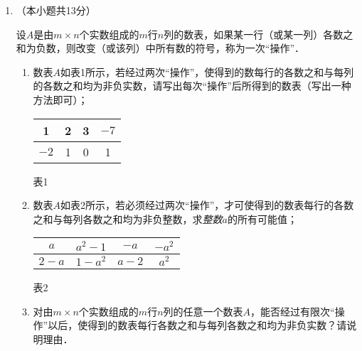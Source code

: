 \documentclass[a4paper]{ctexart}%
\begin{document}
\begin{itemize}
\begin{enumerate}[leftmargin=*]
\bigskip\bigskip\bigskip\bigskip

\item （本小题共13分）

设$A$是由$m\times n$个实数组成的$m$行$n$列的数表，如果某一行（或某一列）各数之和为负数，则改变（或该列）中所有数的符号，称为一次“操作”．
\begin{enumerate}[align=left,leftmargin=*,labelsep=0pt,label= \hspace{-0.33em} （\Roman*）]
\item 数表$A$如表1所示，若经过两次“操作”，使得到的数每行的各数之和与每列的各数之和均为非负实数，请写出每次“操作”后所得到的数表（写出一种方法即可）；
\begin{center}
    \begin{tabular}{|c|c|c|c|}
  \hline
             1           &    2         & 3     &$-7$ \\
  \hline
             $-2$    &     1         &0	     &1 \\
  \hline
\end{tabular}

  表1
\end{center}

\item 数表$A$如表2所示，若必须经过两次“操作”，才可使得到的数表每行的各数之和与每列各数之和均为非负整数，求\emph{整数}$a$的所有可能值；

\begin{center}
\begin{tabular}{|c|c|c|c|}
  \hline
             $a$          &   $a^2-1$         & $-a$     &$-a^2$ \\
  \hline
             $2-a$          &   $1-a^2$         & $a-2$     &$a^2$ \\
  \hline
\end{tabular}

  表2
\end{center}

\item 对由$m\times n$个实数组成的$m$行$n$列的任意一个数表$A$，能否经过有限次“操作”以后，使得到的数表每行各数之和与每列各数之和均为非负实数？请说明理由．\end{enumerate}



\end{enumerate}

\end{itemize}
\end{document}
